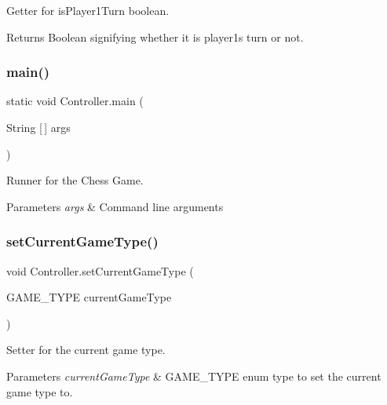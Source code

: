 Getter for is\+Player1\+Turn boolean. \begin{DoxyReturn}{Returns}
Boolean signifying whether it is player1\textquotesingle{}s turn or not. 
\end{DoxyReturn}
\mbox{\label{class_controller_a173fe03517370b8cbd226184a1a4554a}} 
\subsubsection{\texorpdfstring{main()}{main()}}
{\footnotesize\ttfamily static void Controller.\+main (\begin{DoxyParamCaption}\item[{String \mbox{[}$\,$\mbox{]}}]{args }\end{DoxyParamCaption})\hspace{0.3cm}{\ttfamily [static]}}

Runner for the Chess Game. 
\begin{DoxyParams}{Parameters}
{\em args} & Command line arguments \\
\hline
\end{DoxyParams}
\mbox{\label{class_controller_aa308ff964753afb8fb1f8b9c753dc214}} 
\subsubsection{\texorpdfstring{set\+Current\+Game\+Type()}{setCurrentGameType()}}
{\footnotesize\ttfamily void Controller.\+set\+Current\+Game\+Type (\begin{DoxyParamCaption}\item[{G\+A\+M\+E\+\_\+\+T\+Y\+PE}]{current\+Game\+Type }\end{DoxyParamCaption})}

Setter for the current game type. 
\begin{DoxyParams}{Parameters}
{\em current\+Game\+Type} & G\+A\+M\+E\+\_\+\+T\+Y\+PE enum type to set the current game type to. \\
\hline
\end{DoxyParams}
\mbox{\label{class_controller_a4c83cbb9d5736813988acb340ccd709f}} 
